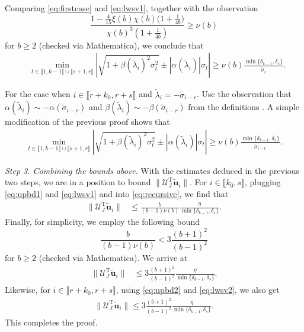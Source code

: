 \documentclass[reqno]{amsart}
\newcommand{\T}{\mathrm{T}}
\theoremstyle{plain}
\theoremstyle{definition}
\begin{document}
Comparing \eqref{eq:firstcase} and \eqref{eq:lwsv1}, together with the observation $$\frac{1- \frac{4}{15}\xi(b)\chi(b)\big(1+\frac{1}{4b}\big)}{ \chi(b)^3 \left( 1+\frac{1}{4b} \right)} \ge \nu(b)$$ for $b\ge 2$ (checked via Mathematica), we conclude that
\begin{align}\label{eq:lwsv1}
&\min_{t\in \llbracket 1, k-1\rrbracket \cup \llbracket s+1, r\rrbracket} \left| \sqrt{1+\beta(\widetilde \lambda_i)^2 \sigma_t^2} \pm |\alpha(\widetilde \lambda_i)| \sigma_t \right| \ge \nu(b)\frac{\min\{\delta_{k-1},\delta_s\}}{\widetilde \sigma_i}.
\end{align}






For the case when $ i\in \llbracket r+k_0, r+s\rrbracket$ and $\widetilde \lambda_i = -\widetilde \sigma_{i-r}$. Use the observation that $\alpha(\widetilde \lambda_i) \sim -\alpha(\widetilde \sigma_{i-r})$ and $\beta(\widetilde \lambda_i) \sim -\beta(\widetilde \sigma_{i-r})$ from the definitions \cite[Eq. (27)]{Wang24}. A simple modification of the previous proof shows that
\begin{align}\label{eq:lwsv2}
\min_{t\in \llbracket 1, k-1\rrbracket \cup \llbracket s+1, r\rrbracket} \left| \sqrt{1+\beta(\widetilde \lambda_i)^2 \sigma_t^2} \pm |\alpha(\widetilde \lambda_i)| \sigma_t \right| \ge \nu(b)\frac{\min\{\delta_{k-1},\delta_s\}}{\widetilde \sigma_{i-r}}.
\end{align}

\medskip
\noindent\emph{Step 3. Combining the bounds above}.
With the estimates deduced in the previous two steps, we are in a position to bound $\| {\mathcal U}_J^\T \widetilde{\mathbf u}_i \|$. For $i\in \llbracket k_0,s\rrbracket $,
plugging \eqref{eq:upbd1} and \eqref{eq:lwsv1} and  into \eqref{eq:recursive}, we find that 
\begin{align*}%
\| {\mathcal U}_J^\T \widetilde{\mathbf u}_i \| &\le \frac{b}{(b-1)\nu(b)} \frac{\eta}{\min\{\delta_{k-1}, \delta_s\}}.
\end{align*}
Finally, for simplicity, we employ the following bound $$ \frac{b}{(b-1)\nu(b)} < 3 \frac{(b+1)^2}{(b-1)^2}$$ for $b\ge 2$ (checked via Mathematica). We arrive at
\begin{align*}%
\| {\mathcal U}_J^\T \widetilde{\mathbf u}_i \| &\le 3 \frac{(b+1)^2}{(b-1)^2} \frac{\eta}{\min\{\delta_{k-1}, \delta_s\}}. 
\end{align*}
Likewise, for $i\in \llbracket r+k_0, r+s\rrbracket$, using  \eqref{eq:upbd2} and \eqref{eq:lwsv2}, we also get
\begin{align*}%
\| {\mathcal U}_J^\T \widetilde{\mathbf u}_i \| \le 3 \frac{(b+1)^2}{(b-1)^2} \frac{\eta}{\min\{\delta_{k-1}, \delta_s\}}.
\end{align*}
This completes the proof.
\end{document}
